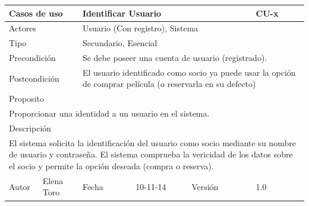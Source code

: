 \documentclass{article}
\begin{document}
\begin{table}[h]
\begin{tabular}{|l|l|l|l|l|l|}
\hline
\multicolumn{2}{|p{2cm}|}{Casos de uso}  & \multicolumn{3}{p{7cm}|}{\textbf{Identificar Usuario}} & CU-x \\
\hline
\multicolumn{2}{|p{2cm}|}{Actores}       & \multicolumn{4}{p{8cm}|}{Usuario (Con registro), Sistema}        \\
\hline
\multicolumn{2}{|p{2cm}|}{Tipo}          & \multicolumn{4}{p{8cm}|}{Secundario, Esencial}        \\
\hline
\multicolumn{2}{|p{2cm}|}{Precondición}  & \multicolumn{4}{p{8cm}|}{Se debe poseer una cuenta de usuario (registrado).}        \\
\hline
\multicolumn{2}{|p{2cm}|}{Postcondición} & \multicolumn{4}{p{8cm}|}{El usuario identificado como socio ya puede usar la opción de comprar película (o reservarla en su defecto)}        \\
\hline
\multicolumn{6}{|p{10cm}|}{Proposito}                                   \\
\hline
\multicolumn{6}{|p{10cm}|}{Proporcionar una identidad a un usuario en el sistema.}                                            \\
\hline
\multicolumn{6}{|p{10cm}|}{Descripción}                                 \\
\hline
\multicolumn{6}{|p{10cm}|}{El sistema solicita la identificación del usuario como socio mediante su nombre de usuario y contraseña. El sistema comprueba la vericidad de los datos sobre el socio y permite la opción deseada (compra o reserva).}                                            \\
\hline
Autor           &Elena Toro              & Fecha    &10-11-14     &   Versión  &1.0\\    
\hline
\end{tabular}
\end{table}
\end{document}
